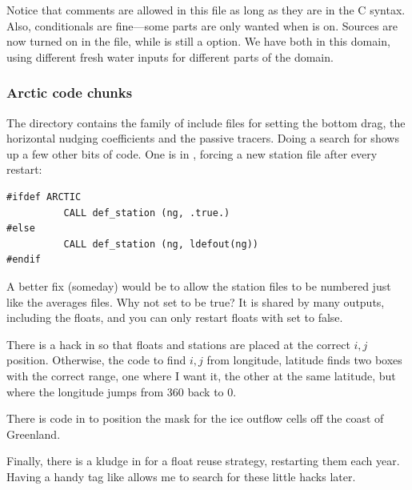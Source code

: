 Notice that comments are allowed in this file as long as they are in
the C syntax. Also, conditionals are fine---some parts are only
wanted when  is on. Sources are now turned on in the
 file, while  is still a
 option. We have both in this domain, using different
fresh water inputs for different parts of the domain.

\subsubsection{Arctic code chunks}
The  directory contains the 
family of include files for setting the bottom drag, the horizontal
nudging coefficients and the passive tracers.
Doing a search for  shows up a few other bits of code. One
is in , forcing a new station file after every
restart:
\begin{verbatim}
#ifdef ARCTIC
          CALL def_station (ng, .true.)
#else
          CALL def_station (ng, ldefout(ng))
#endif
\end{verbatim}
A better fix (someday) would be to allow the station files to be
numbered just like the averages files. Why not set  to
be true? It is shared by many outputs, including the floats, and you
can only restart floats with  set to false.

There is a hack in  so that floats and stations
are placed at the correct $i,j$ position. Otherwise, the code to
find $i,j$ from longitude, latitude finds two boxes with the correct
range, one where I want it, the other at the same latitude, but
where the longitude jumps from 360 back to 0.

There is code in  to position the mask for
the ice outflow cells off the coast of Greenland.

Finally, there is a kludge in  for a
float reuse strategy, restarting them each year. Having a handy tag like
 allows me to search for these little hacks later.

